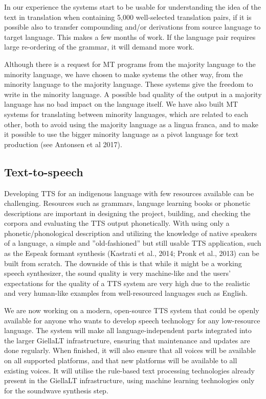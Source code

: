 \documentclass[free]{flammie}
\begin{document}
In our experience the systems start to be usable for understanding the idea of the text in
translation when containing 5,000 well-selected translation pairs, if it is possible also to
transfer compounding and/or derivations from source language to target language. This
makes a few months of work. If the language pair requires large re-ordering of the grammar, it will demand more work.

Although there is a request for MT programs from the majority language to the minority
language, we have chosen to make systems the other way, from the minority language to
the majority language. These systems give the freedom to write in the minority language.
A possible bad quality of the output in a majority language has no bad impact on the language itself. We have also built MT systems for translating between minority languages,
which are related to each other, both to avoid using the majority language as a lingua franca,
and to make it possible to use the bigger minority language as a pivot language for text
production (see Antonsen et al 2017).

\subsection{Text-to-speech}

Developing TTS for an indigenous language with few resources available can be challenging. Resources such as grammars, language learning books or phonetic descriptions are
important in designing the project, building, and checking the corpora and evaluating the
TTS output phonetically. With using only a phonetic/phonological description and utilizing
the knowledge of native speakers of a language, a simple and ”old-fashioned” but still usable TTS application, such as the Espeak formant synthesis (Kastrati et al., 2014; Pronk et
al., 2013) can be built from scratch. The downside of this is that while it might be a working
speech synthesizer, the sound quality is very machine-like and the users’ expectations for
the quality of a TTS system are very high due to the realistic and very human-like examples
from well-resourced languages such as English.

We are now working on a modern, open-source TTS system that could be openly available for anyone who wants to develop speech technology for any low-resource language.
The system will make all language-independent parts integrated into the larger GiellaLT
infrastructure, ensuring that maintenance and updates are done regularly. When finished, it
will also ensure that all voices will be available on all supported platforms, and that new
platforms will be available to all existing voices. It will utilise the rule-based text
processing technologies already present in the GiellaLT infrastructure, using machine
learning technologies only for the soundwave synthesis step.
\end{document}
